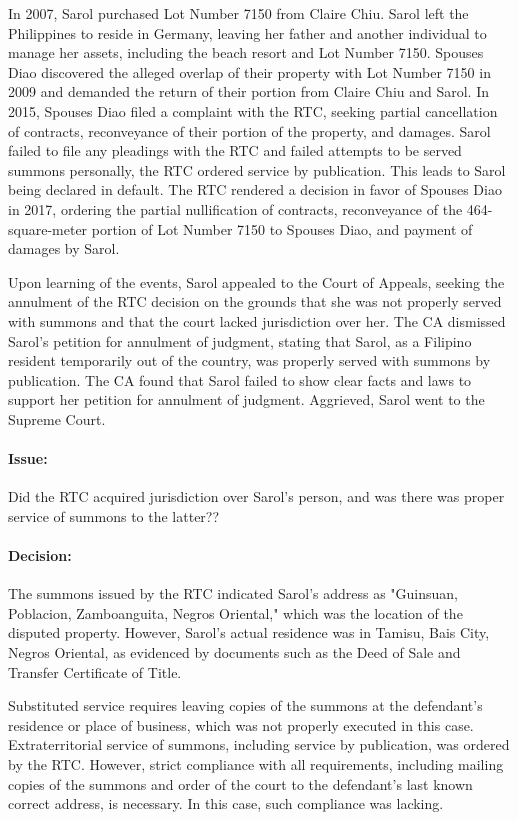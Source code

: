 \documentclass[
12pt,
oneside,
onehalfspacing,
headsepline
]{DigestCollection}
\begin{document}
In 2007, Sarol purchased Lot Number 7150 from Claire Chiu. Sarol left the Philippines to reside in Germany, leaving her father and another individual to manage her assets, including the beach resort and Lot Number 7150. Spouses Diao discovered the alleged overlap of their property with Lot Number 7150 in 2009 and demanded the return of their portion from Claire Chiu and Sarol. In 2015, Spouses Diao filed a complaint with the RTC, seeking partial cancellation of contracts, reconveyance of their portion of the property, and damages. Sarol failed to file any pleadings with the RTC and failed attempts to be served summons personally, the RTC ordered service by publication. This leads to Sarol being declared in default. The RTC rendered a decision in favor of Spouses Diao in 2017, ordering the partial nullification of contracts, reconveyance of the 464-square-meter portion of Lot Number 7150 to Spouses Diao, and payment of damages by Sarol.

Upon learning of the events, Sarol appealed to the Court of Appeals, seeking the annulment of the RTC decision on the grounds that she was not properly served with summons and that the court lacked jurisdiction over her. The CA dismissed Sarol's petition for annulment of judgment, stating that Sarol, as a Filipino resident temporarily out of the country, was properly served with summons by publication. The CA found that Sarol failed to show clear facts and laws to support her petition for annulment of judgment. Aggrieved, Sarol went to the Supreme Court.

\paragraph{Issue:}

Did the RTC acquired jurisdiction over Sarol's person, and was there was proper service of summons to the latter??

\paragraph{Decision:}


The summons issued by the RTC indicated Sarol's address as "Guinsuan, Poblacion, Zamboanguita, Negros Oriental," which was the location of the disputed property. However, Sarol's actual residence was in Tamisu, Bais City, Negros Oriental, as evidenced by documents such as the Deed of Sale and Transfer Certificate of Title.

Substituted service requires leaving copies of the summons at the defendant's residence or place of business, which was not properly executed in this case. Extraterritorial service of summons, including service by publication, was ordered by the RTC. However, strict compliance with all requirements, including mailing copies of the summons and order of the court to the defendant's last known correct address, is necessary. In this case, such compliance was lacking.
\end{document}
